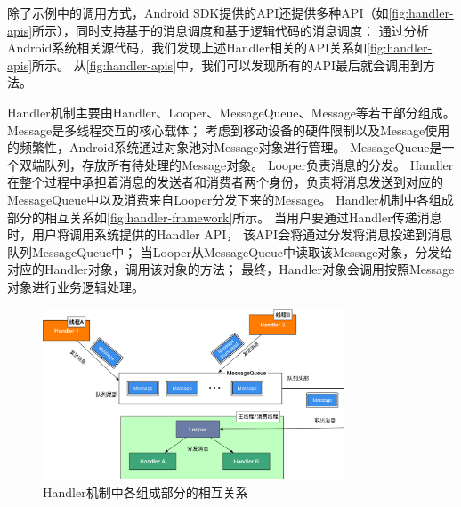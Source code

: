 除了示例中的调用方式，Android SDK提供的API\cite{HandlerA26:online}还提供多种API（如\autoref{fig:handler-apis}所示），同时支持基于的消息调度和基于逻辑代码的消息调度：
 通过分析Android系统相关源代码，我们发现上述Handler相关的API关系如\autoref{fig:handler-apis}所示。
从\autoref{fig:handler-apis}中，我们可以发现所有的API最后就会调用到方法。


Handler机制主要由Handler、Looper、MessageQueue、Message等若干部分组成。
 Message是多线程交互的核心载体；
考虑到移动设备的硬件限制以及Message使用的频繁性，Android系统通过对象池对Message对象进行管理。
MessageQueue是一个双端队列，存放所有待处理的Message对象。
Looper负责消息的分发。
Handler在整个过程中承担着消息的发送者和消费者两个身份，负责将消息发送到对应的MessageQueue中以及消费来自Looper分发下来的Message。
Handler机制中各组成部分的相互关系如\autoref{fig:handler-framework}所示。
当用户要通过Handler传递消息时，用户将调用系统提供的Handler API，
该API会将通过分发将消息投递到消息队列MessageQueue中；
当Looper从MessageQueue中读取该Message对象，分发给对应的Handler对象，调用该对象的方法；%
最终，Handler对象会调用按照Message对象进行业务逻辑处理。
\begin{figure}[!ht]
	\centering
	\includegraphics[width=0.8\textwidth]{./Figures/Handler-framework.png}
	\caption{ Handler机制中各组成部分的相互关系}
	\label{fig:handler-framework}
\end{figure}


